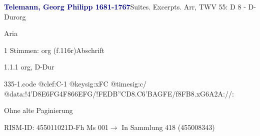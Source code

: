 \documentclass[twocolumn]{book}
\begin{document}
\par \vspace{7pt} \textcolor{darkblue}{\textbf{Telemann, Georg Philipp  1681-1767}}\hfillplus{\textbf{[335]}}\newline Suites. Excerpts. Arr, TWV 55: D 8 - D-Dur\newline org
\par \begin{itshape}[f.116r, heading:] Aria\end{itshape} 
\par \textcolor{darkblue}{}  1 Stimmen: org  (f.116r)\newline Abschrift
\par 1.1.1  org, D-Dur  
\begin{filecontents*}{335-1.code}
@clef:C-1
@keysig:xFC
@timesig:c/
@data:!4'D{8E6FG}4F{866EFG}/!{FED}{B''CD}{8.C6'B}{AGFE}/f{8FB}{8.xG6A}2A://:
\end{filecontents*}
\newline
%
\par Ohne alte Paginierung
\par RISM-ID: 455011021\newline D-Fh  Ms 001\newline $\rightarrow$ In Sammlung 418 (455008343)
      
\end{document}
